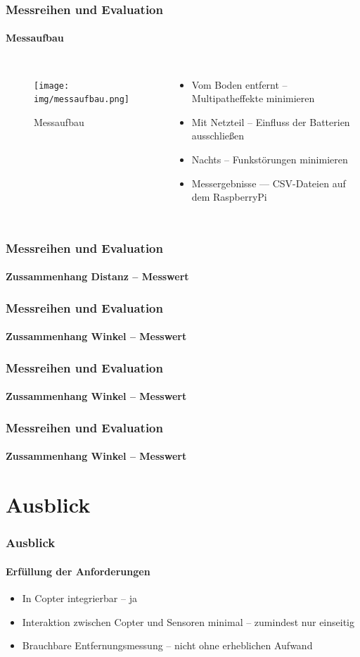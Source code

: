 \documentclass{beamer}
\begin{document}
\begin{frame}
	\frametitle{Messreihen und Evaluation}
	\framesubtitle{Messaufbau}
	\begin{columns}
		\begin{figure}
			\centering
			\texttt{[image: img/messaufbau.png]}
			\caption{Messaufbau}
		\end{figure}
		\begin{itemize}
			\item Vom Boden entfernt – Multipatheffekte minimieren
			\item Mit Netzteil – Einfluss der Batterien ausschließen
			\item Nachts – Funkstörungen minimieren
			\item Messergebnisse — CSV-Dateien auf dem RaspberryPi
		\end{itemize}
	\end{columns}
\end{frame}

\begin{frame}
	\frametitle{Messreihen und Evaluation}
	\framesubtitle{Zussammenhang Distanz – Messwert}
	


\end{frame}

\begin{frame}
	\frametitle{Messreihen und Evaluation}
	\framesubtitle{Zussammenhang Winkel – Messwert}
	
\end{frame}

\begin{frame}
	\frametitle{Messreihen und Evaluation}
	\framesubtitle{Zussammenhang Winkel – Messwert}
	
\end{frame}


\begin{frame}
	\frametitle{Messreihen und Evaluation}
	\framesubtitle{Zussammenhang Winkel – Messwert}
	
\end{frame}

\section{Ausblick}
\begin{frame}
	\frametitle{Ausblick}
	\framesubtitle{Erfüllung der Anforderungen}
	\begin{itemize}
		\item In Copter integrierbar – ja
		\item Interaktion zwischen Copter und Sensoren minimal – zumindest nur einseitig
		\item Brauchbare Entfernungsmessung – nicht ohne erheblichen Aufwand
	\end{itemize}
\end{frame}
\end{document}
